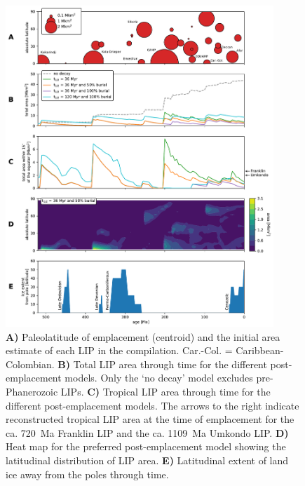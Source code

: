 \documentclass[11pt,letterpaper]{article}
\begin{document}
\begin{figure}[h!]
\begin{center}
	\includegraphics[width=0.9\textwidth]{Manuscript/Figures/LIP_Areas.pdf}
	\caption{\textbf{A)} Paleolatitude of emplacement (centroid) and the initial area estimate of each LIP in the compilation. Car.-Col. = Caribbean-Colombian. \textbf{B)} Total LIP area through time for the different post-emplacement models. Only the `no decay' model excludes pre-Phanerozoic LIPs. \textbf{C)} Tropical LIP area through time for the different post-emplacement models. The arrows to the right indicate reconstructed tropical LIP area at the time of emplacement for the ca. 720~Ma Franklin LIP and the ca. 1109~Ma Umkondo LIP. \textbf{D)} Heat map for the preferred post-emplacement model showing the latitudinal distribution of LIP area. \textbf{E)} Latitudinal extent of land ice away from the poles through time.}
	\label{fig:LIP_area}
\end{center}
\end{figure}
\end{document}
